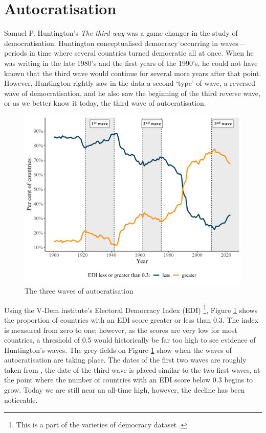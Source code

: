 \section{Autocratisation}
Samuel P. Huntington's \textit{The third way} \citeyearpar{huntington_third_1991} was a game changer in the study of democratisation. Huntington conceptualised democracy occurring in waves---periods in time where several countries turned democratic all at once. When he was writing in the late 1980's and the first years of the 1990's, he could not have known that the third wave would continue for several more years after that point. However, Huntington rightly saw in the data a second `type' of wave, a reversed wave of democratisation, and he also saw the beginning of the third  reverse wave, or as we better know it today, the third wave of autocratisation.

\begin{figure}[hbt!]
\centering
\includegraphics[width = \textwidth]{waves.jpeg}
\caption{\label{fig:autocratisation}The three waves of autocratisation}
\end{figure}

Using the V-Dem institute's Electoral Democracy Index (EDI) \footnote{This is a part of the varieties of democracy dataset \citep{coppedge_v-dem_2025}.}, Figure \ref{fig:autocratisation} shows the proportion of countries with an EDI score greater or less than 0.3. The index is measured from zero to one; however, as the scores are very low for most countries, a threshold of 0.5 would historically be far too high to see evidence of Huntington's waves. The grey fields on Figure \ref{fig:autocratisation} show when the waves of autocratisation are taking place. The dates of the first two waves are roughly taken from \citet[p.16]{huntington_third_1991} , the date of the third wave is placed similar to the two first waves, at the point where the number of countries with an EDI score below 0.3 begins to grow. Today we are still near an all-time high, however, the decline has been noticeable. 

